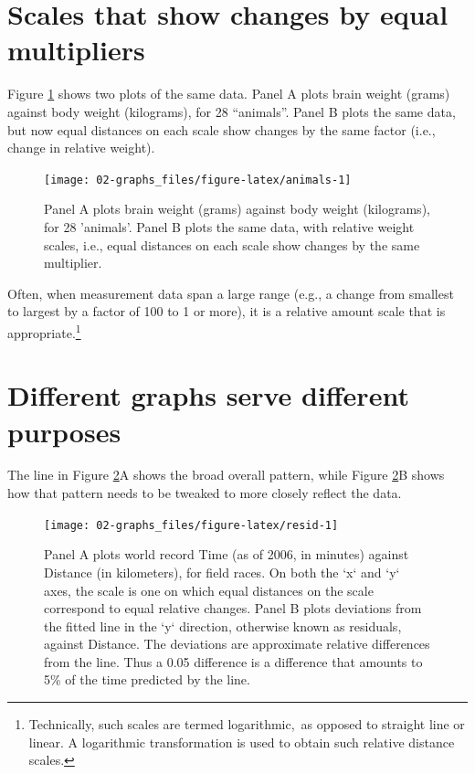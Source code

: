 \documentclass[
  10pt,
  b5paper]{book}
\begin{document}
\hypertarget{scales-that-show-changes-by-equal-multipliers}{%
\section{Scales that show changes by equal multipliers}\label{scales-that-show-changes-by-equal-multipliers}}

Figure \ref{fig:animals} shows two plots of the same data.
Panel A plots brain weight (grams) against body weight (kilograms),
for 28 ``animals''. Panel B plots the same data, but now equal distances
on each scale show changes by the same factor (i.e., change in relative
weight).

\begin{figure}[H]

{\centering \texttt{[image: 02-graphs\_files/figure-latex/animals-1]} 

}

\caption{Panel A plots brain weight (grams) against body weight 
(kilograms), for 28 'animals'.  Panel B plots the same data, 
with relative weight scales, i.e., equal distances on each scale 
show changes by the same multiplier.}\label{fig:animals}
\end{figure}

Often, when measurement data span a large range (e.g., a change
from smallest to largest by a factor of 100 to 1 or more),
it is a relative amount scale that is appropriate.\footnote{Technically,
  such scales are termed logarithmic,~as opposed to straight
  line or linear. A logarithmic transformation is used to
  obtain such relative distance scales.}

\hypertarget{track}{%
\section{Different graphs serve different purposes}\label{track}}

The line in Figure \ref{fig:resid}A shows the broad overall
pattern, while Figure \ref{fig:resid}B shows how that pattern
needs to be tweaked to more closely reflect the data.

\begin{figure}[H]

{\centering \texttt{[image: 02-graphs\_files/figure-latex/resid-1]} 

}

\caption{Panel A plots world record Time (as of 2006, in minutes)
against Distance (in kilometers), for field races.  On both the
`x` and `y` axes, the scale is one on which equal distances on 
the scale correspond to equal relative changes.  Panel B plots
deviations from the fitted line in the `y` direction, otherwise
known as residuals, against Distance. The deviations are
approximate relative differences from the line.  Thus a 0.05
difference is a difference that amounts to 5\% of the time
predicted by the line.}\label{fig:resid}
\end{figure}
\end{document}
